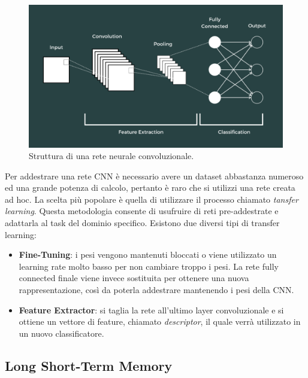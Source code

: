 \documentclass[11pt]{report}
\begin{document}
\begin{figure}[h]
    \centering
    \includegraphics[scale = 0.3]{img/cnn.png}
    \caption[Struttura di una rete neurale convoluzionale.]{Struttura di una rete neurale convoluzionale.\footnotemark}
    \label{fig:cnn}
\end{figure}




Per addestrare una rete CNN è necessario avere un dataset abbastanza numeroso ed una grande potenza di calcolo, pertanto è raro che si utilizzi una rete creata ad hoc. La scelta più popolare è quella di utilizzare il processo chiamato \textit{tansfer learning}. Questa metodologia consente di usufruire di reti pre-addestrate e adattarla al task del dominio specifico. Esistono due diversi tipi di transfer learning:
\begin{itemize}
    \item \textbf{Fine-Tuning}: i pesi vengono mantenuti bloccati o viene utilizzato un learning rate molto basso per non cambiare troppo i pesi. La rete fully connected finale viene invece sostituita per ottenere una nuova rappresentazione, così da poterla addestrare mantenendo i pesi della CNN. 
    

    \item \textbf{Feature Extractor}: si taglia la rete all'ultimo layer convoluzionale e si ottiene un vettore di feature, chiamato \textit{descriptor}, il quale verrà utilizzato in un nuovo classificatore.

\end{itemize}

\subsection{Long Short-Term Memory}
\end{document}
